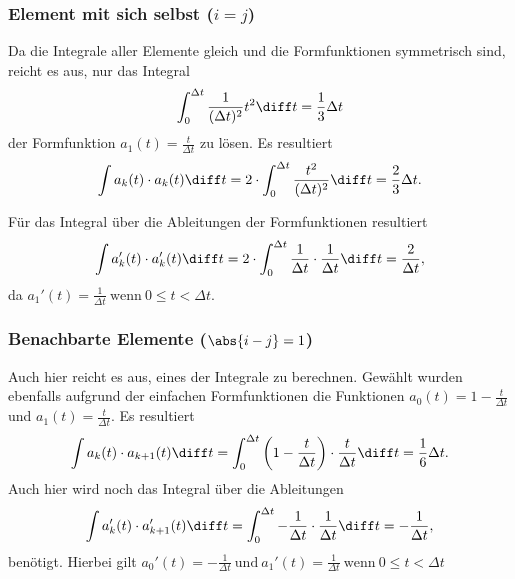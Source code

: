 \subsubsection{Element mit sich selbst ($i = j$)} %
Da die Integrale aller Elemente gleich und die Formfunktionen symmetrisch sind, reicht es aus, nur das Integral
\begin{equation}
    \int_{0}^{\Delta t} \frac{1}{(\Delta t)^2} t^2 \diff t = \frac{1}{3} \Delta t
\end{equation}
der Formfunktion $ a_1(t) = \frac{t}{\Delta t} $ zu lösen.
Es resultiert
\begin{equation}
    \int a_k(t) \cdot a_k(t) \diff t = 2 \cdot \int_{0}^{\Delta t} \frac{t^2}{(\Delta t)^2} \diff t = \frac{2}{3} \Delta t.
\end{equation}

Für das Integral über die Ableitungen der Formfunktionen resultiert
\begin{equation}
    \int a_k'(t) \cdot a_k'(t) \diff t = 2 \cdot \int_{0}^{\Delta t} \frac{1}{\Delta t} \cdot \frac{1}{\Delta t} \diff t = \frac{2}{\Delta t},
\end{equation}
da $a_1'(t)= \frac{1}{\Delta t} \ \mbox{wenn} \ 0 \leq t < \Delta t$.

\subsubsection{Benachbarte Elemente ($\abs{i - j} = 1$)}
Auch hier reicht es aus, eines der Integrale zu berechnen. 
Gewählt wurden ebenfalls aufgrund der einfachen Formfunktionen die Funktionen $a_0(t) = 1 - \frac{t}{\Delta t}$ und $a_1(t) = \frac{t}{\Delta t}$.
Es resultiert
\begin{equation}
    \int a_k(t) \cdot a_{k+1}(t) \diff t = \int_{0}^{\Delta t} \left(1 - \frac{t}{\Delta t}\right) \cdot \frac{t}{\Delta t} \diff t = \frac{1}{6} \Delta t.
\end{equation}
Auch hier wird noch das Integral über die Ableitungen 
\begin{equation}
    \int a_k'(t) \cdot a_{k+1}'(t) \diff t = \int_{0}^{\Delta t} -\frac{1}{\Delta t} \cdot \frac{1}{\Delta t} \diff t = -\frac{1}{\Delta t},
\end{equation}
benötigt.
Hierbei gilt $a_0'(t)= -\frac{1}{\Delta t} \ \mbox{und} \ a_1'(t)= \frac{1}{\Delta t} \ \mbox{wenn} \ 0 \leq t < \Delta t$

